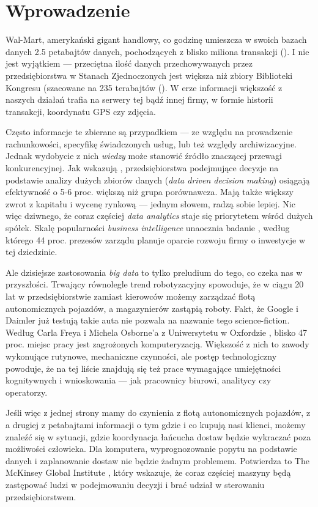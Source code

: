\documentclass[polish, twoside, 12pt, a4paper]{article}
\theoremstyle{definition}
\theoremstyle{plain}
\theoremstyle{remark}
\begin{document}
\cleardoublepage
\section{Wprowadzenie}

Wal-Mart, amerykański gigant handlowy, co godzinę umieszcza w swoich bazach danych 2.5 petabajtów danych, pochodzących z blisko miliona transakcji (\cite{Economist2010}). I nie jest wyjątkiem --- przeciętna ilość danych przechowywanych przez przedsiębiorstwa w Stanach Zjednoczonych jest większa niż zbiory Biblioteki Kongresu (szacowane na 235 terabajtów (\cite{McKinsey2011}). W erze informacji większość z naszych działań trafia na serwery tej bądź innej firmy, w formie historii transakcji, koordynatu GPS czy zdjęcia. 

Często informacje te zbierane są przypadkiem --- ze względu na prowadzenie rachunkowości, specyfikę świadczonych usług, lub też względy archiwizacyjne. Jednak wydobycie z nich \textit{wiedzy} może stanowić źródło znaczącej przewagi konkurencyjnej.  Jak wskazują \cite{Brynjolfsson2011}, przedsiębiorstwa podejmujące decyzje na podstawie analizy dużych zbiorów danych (\textit{data driven decision making}) osiągają efektywność o 5-6 proc. większą niż grupa porównawcza. Mają także większy zwrot z kapitału i wycenę rynkową --- jednym słowem, radzą sobie lepiej. Nic więc dziwnego, że coraz częściej \textit{data analytics} staje się priorytetem wśród dużych spółek. Skalę popularności \textit{business intelligence} unaocznia badanie \cite{PwC2014}, według którego 44 proc. prezesów zarządu planuje oparcie rozwoju firmy o inwestycje w tej dziedzinie. 

Ale dzisiejsze zastosowania \textit{big data} to tylko preludium do tego, co czeka nas w przyszłości. Trwający równolegle trend robotyzacyjny spowoduje, że w ciągu 20 lat w przedsiębiorstwie zamiast kierowców możemy zarządzać flotą autonomicznych pojazdów, a magazynierów zastąpią roboty. Fakt, że Google i Daimler już testują takie auta nie pozwala na nazwanie tego science-fiction. Według Carla Freya i Michela Osborne'a z Uniwersytetu w Oxfordzie \cite{frey2013}, blisko 47 proc. miejsc pracy jest zagrożonych komputeryzacją. Większość z nich to zawody wykonujące rutynowe, mechaniczne czynności, ale postęp technologiczny powoduje, że na tej liście znajdują się też prace wymagające umiejętności kognitywnych i wnioskowania --- jak pracownicy biurowi, analitycy czy operatorzy. 

Jeśli więc z jednej strony mamy do czynienia z flotą autonomicznych pojazdów, z a drugiej z petabajtami informacji o tym gdzie i co kupują nasi klienci, możemy znaleźć się w sytuacji, gdzie koordynacja łańcucha dostaw będzie wykraczać poza możliwości człowieka. Dla komputera, wyprognozowanie popytu na podstawie danych i zaplanowanie dostaw nie będzie żadnym problemem. Potwierdza to The McKinsey Global Institute \cite{McKinsey2011}, który wskazuje, że coraz częściej maszyny będą zastępować ludzi w podejmowaniu decyzji i brać udział w sterowaniu przedsiębiorstwem. 
\end{document}

